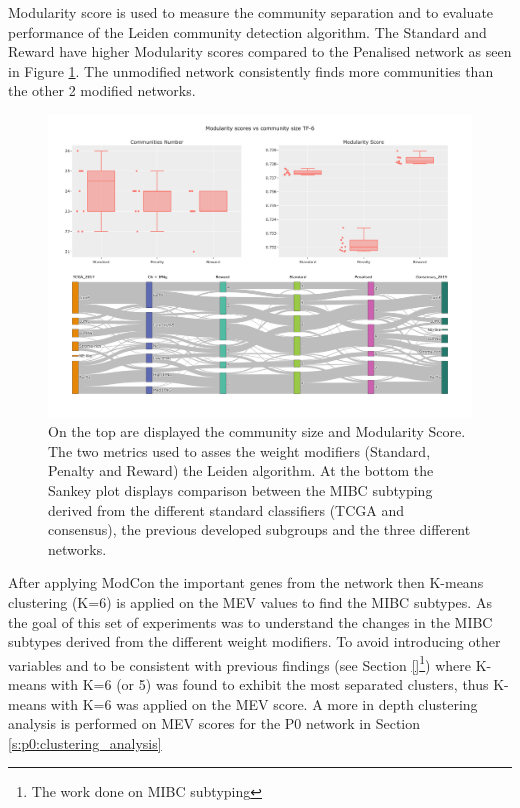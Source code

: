 Modularity score is used to measure the community separation and to evaluate performance of the Leiden community detection algorithm. The Standard and Reward have higher Modularity scores compared to the Penalised network as seen in Figure \ref{fig:N_I:tum_leiden_modifiers}. The unmodified network consistently finds more communities than the other 2 modified networks. 

\begin{figure}[!htb]    \centering\includegraphics[width=1.0\textwidth,height=0.6\textheight,keepaspectratio]{Sections/Network_I/Resources/Tum_network/LeidenMetrics_Sankey_TF-6.png}
    \caption{On the top are displayed the community size and Modularity Score. The two metrics used to asses the weight modifiers (Standard, Penalty and Reward) the Leiden algorithm. At the bottom the Sankey plot displays comparison between the MIBC subtyping derived from the different standard classifiers (TCGA and consensus), the previous developed subgroups and the three different networks. }
    \label{fig:N_I:tum_leiden_modifiers}
\end{figure}


After applying ModCon the important genes from the network then K-means clustering (K=6) is applied on the MEV values to find the MIBC subtypes. As the goal of this set of experiments was to understand the changes in the MIBC subtypes derived from the different weight modifiers. To avoid introducing other variables and to be consistent with previous findings (see Section \ref{}\footnote{The work done on MIBC subtyping}) where K-means with K=6 (or 5) was found to exhibit the most separated clusters, thus K-means with K=6 was applied on the MEV score. A more in depth clustering analysis is performed on MEV scores for the P0 network in Section \ref{s:p0:clustering_analysis} 

